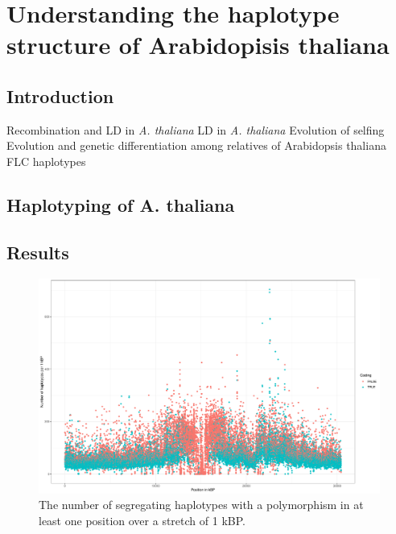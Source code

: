 
\chapter{Understanding the haplotype structure of Arabidopisis thaliana } %

\label{Chapter1} %




\section{Introduction}

Recombination and LD in \textit{A. thaliana} \cite{kim2007recombination}
LD in \textit{A. thaliana} \cite{nordborg2002extent}
Evolution of selfing \cite{tang2007evolution}
Evolution and genetic differentiation among relatives of Arabidopsis thaliana \cite{koch2007evolution}
FLC haplotypes \cite{li2014multiple}



\section{Haplotyping of A. thaliana}

\section{Results}

\begin{figure}[th]
\centering
\includegraphics[height=.55\textheight, width=1.1\textwidth]{Figures/chr1_hap}
\decoRule
\caption[Haplotype strutcture of chromosome 1 of \textit{A. thaliana}]{The number of segregating haplotypes with a polymorphism in at least one position over a stretch of 1 kBP. }
\label{fig:chr1}
\end{figure}



